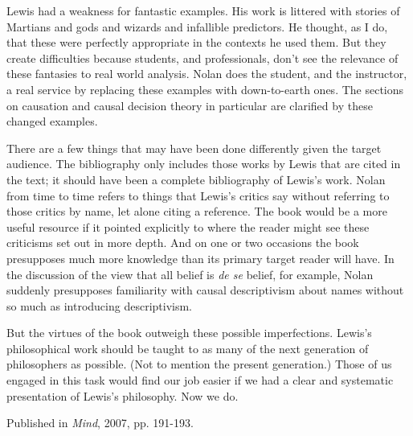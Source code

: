 \documentclass[
  10pt,
  letterpaper,
  DIV=11,
  numbers=noendperiod,
  twoside]{scrartcl}
\begin{document}
Lewis had a weakness for fantastic examples. His work is littered with
stories of Martians and gods and wizards and infallible predictors. He
thought, as I do, that these were perfectly appropriate in the contexts
he used them. But they create difficulties because students, and
professionals, don't see the relevance of these fantasies to real world
analysis. Nolan does the student, and the instructor, a real service by
replacing these examples with down-to-earth ones. The sections on
causation and causal decision theory in particular are clarified by
these changed examples.

There are a few things that may have been done differently given the
target audience. The bibliography only includes those works by Lewis
that are cited in the text; it should have been a complete bibliography
of Lewis's work. Nolan from time to time refers to things that Lewis's
critics say without referring to those critics by name, let alone citing
a reference. The book would be a more useful resource if it pointed
explicitly to where the reader might see these criticisms set out in
more depth. And on one or two occasions the book presupposes much more
knowledge than its primary target reader will have. In the discussion of
the view that all belief is \emph{de se} belief, for example, Nolan
suddenly presupposes familiarity with causal descriptivism about names
without so much as introducing descriptivism.

But the virtues of the book outweigh these possible imperfections.
Lewis's philosophical work should be taught to as many of the next
generation of philosophers as possible. (Not to mention the present
generation.) Those of us engaged in this task would find our job easier
if we had a clear and systematic presentation of Lewis's philosophy. Now
we do.

\vspace{1cm}



\noindent Published in\emph{
Mind}, 2007, pp. 191-193.
\end{document}
